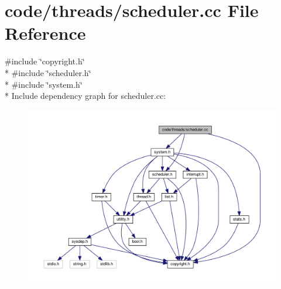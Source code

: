 \section{code/threads/scheduler.cc File Reference}
\label{scheduler_8cc}
{\ttfamily \#include \char`\"{}copyright.\+h\char`\"{}}\\*
{\ttfamily \#include \char`\"{}scheduler.\+h\char`\"{}}\\*
{\ttfamily \#include \char`\"{}system.\+h\char`\"{}}\\*
Include dependency graph for scheduler.\+cc\+:
\nopagebreak
\begin{figure}[H]
\begin{center}
\leavevmode
\includegraphics[width=350pt]{scheduler_8cc__incl}
\end{center}
\end{figure}
